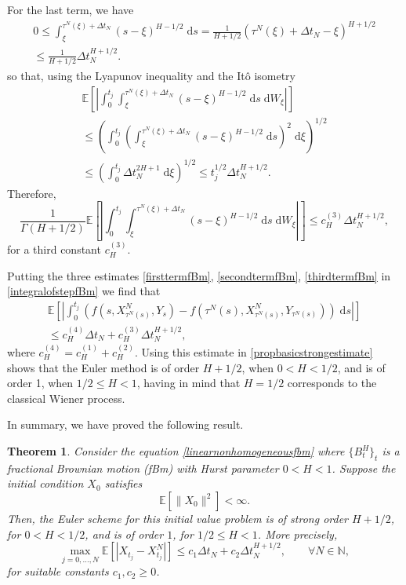 \documentclass[reqno,12pt]{amsart}
\theoremstyle{plain} %
\newtheorem{theorem}{Theorem}[section]
\theoremstyle{definition} %
\begin{document}
For the last term, we have
\begin{multline*}
    0 \leq \int_\xi^{\tau^N(\xi) + \Delta t_N} (s - \xi)^{H-1/2} \;\mathrm{d}s = \frac{1}{H + 1/2} (\tau^N(\xi) + \Delta t_N - \xi)^{H + 1/2} \\
    \leq \frac{1}{H + 1/2} \Delta t_N^{H + 1/2}.
\end{multline*}
so that, using the Lyapunov inequality and the It\^o isometry
\begin{multline*}
    \mathbb{E}\left[\left|\int_0^{t_j} \int_\xi^{\tau^N(\xi) + \Delta t_N} (s - \xi)^{H-1/2} \;\mathrm{d}s \;\mathrm{d}W_\xi\right|\right] \\
    \leq \left( \int_0^{t_j} \left(\int_\xi^{\tau^N(\xi) + \Delta t_N} (s - \xi)^{H-1/2} \;\mathrm{d}s\right)^2 \;\mathrm{d}\xi\right)^{1/2} \\ 
    \leq \left( \int_0^{t_j} \Delta t_N^{2H + 1} \;\mathrm{d}\xi\right)^{1/2} \leq t_j^{1/2} \Delta t_N^{H + 1/2}.
\end{multline*}
Therefore,
\begin{equation}
    \label{thirdtermfBm}
    \frac{1}{\Gamma(H + 1/2)}\mathbb{E}\left[\left|\int_0^{t_j} \int_\xi^{\tau^N(\xi) + \Delta t_N} (s - \xi)^{H-1/2} \;\mathrm{d}s \;\mathrm{d}W_\xi\right|\right] \leq c_H^{(3)} \Delta t_N^{H + 1/2},
\end{equation}
for a third constant $c_H^{(3)}$.

Putting the three estimates \eqref{firsttermfBm}, \eqref{secondtermfBm}, \eqref{thirdtermfBm} in \eqref{integralofstepfBm} we find that
\begin{multline}
    \mathbb{E}\left[\left|\int_0^{t_j} \left( f(s, X_{\tau^N(s)}^N, Y_s) - f(\tau^N(s), X_{\tau^N(s)}^N, Y_{\tau^N(s)}) \right)\;\mathrm{d}s\right|\right] \\
    \leq c_H^{(4)} \Delta t_N + c_H^{(3)} \Delta t_N^{H + 1/2},
\end{multline}
where $c_H^{(4)} = c_H^{(1)} + c_H^{(2)}$. Using this estimate in \cref{propbasicstrongestimate} shows that the Euler method is of order $H + 1/2$, when $0 < H < 1/2$, and is of order 1, when $1/2 \leq H < 1$, having in mind that $H=1/2$ corresponds to the classical Wiener process.

In summary, we have proved the following result.
\begin{theorem}
    Consider the equation \eqref{linearnonhomogeneousfbm} where $\{B^H_t\}_t$ is a fractional Brownian motion (fBm) with Hurst parameter $0 < H < 1$. Suppose the initial condition $X_0$ satisfies
    \begin{equation}
        \label{EX0square2b}
        \mathbb{E}[\|X_0\|^2] < \infty.
    \end{equation}
    Then, the Euler scheme for this initial value problem is of strong order $H+1/2$, for $0 < H < 1/2$, and is of order $1$, for $1/2 \leq H < 1$. More precisely,
    \begin{equation}
        \max_{j=0, \ldots, N}\mathbb{E}\left[ \left| X_{t_j} - X_{t_j}^N \right| \right] \leq c_1 \Delta t_N + c_2 \Delta t_N^{H + 1/2}, \qquad \forall N \in \mathbb{N},
    \end{equation}
    for suitable constants $c_1, c_2 \geq 0$.
\end{theorem}
\end{document}
